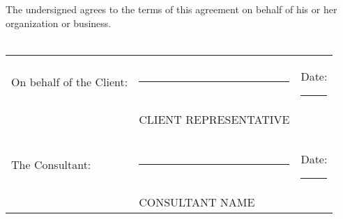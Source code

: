 \documentclass[10pt]{article}
\begin{document}
	\vspace{1cm} 
	
	\noindent The undersigned agrees to the terms of this agreement on behalf of his or
	her organization or business.\\\\
	
	\noindent \begin{tabular}{l l l}
		On behalf of the Client: & \rule{6cm}{.2pt} & Date: \rule{2.4cm}{.2pt}\\
		& CLIENT REPRESENTATIVE      & \\\\\\
		The Consultant:          & \rule{6cm}{.2pt} & Date: \rule{2.4cm}{.2pt}\\
		& CONSULTANT NAME      & \\
	\end{tabular}
	
\end{document}

